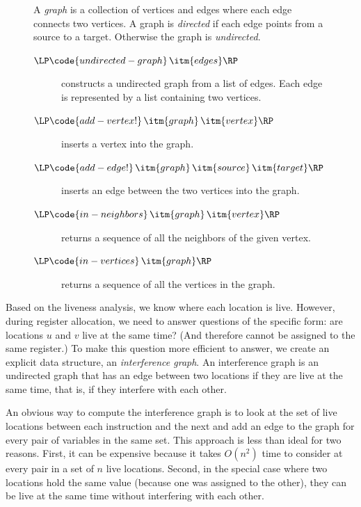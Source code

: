 \documentclass[11pt]{book}
\begin{document}
{\begin{figure}
  \small
  \begin{tcolorbox}[title=\href{https://docs.racket-lang.org/graph/index.html}{The Racket Graph Library}]
    A \emph{graph} is a collection of vertices and edges where each
    edge connects two vertices.  A graph is \emph{directed} if each
    edge points from a source to a target.  Otherwise the graph is
    \emph{undirected}.
  \begin{description}
  \item[$\LP\code{undirected-graph}\,\itm{edges}\RP$] constructs a
    undirected graph from a list of edges. Each edge is represented by
    a list containing two vertices.
  \item[$\LP\code{add-vertex!}\,\itm{graph}\,\itm{vertex}\RP$]
    inserts a vertex into the graph.
  \item[$\LP\code{add-edge!}\,\itm{graph}\,\itm{source}\,\itm{target}\RP$]
    inserts an edge between the two vertices into the graph.
  \item[$\LP\code{in-neighbors}\,\itm{graph}\,\itm{vertex}\RP$]
    returns a sequence of all the neighbors of the given vertex.
  \item[$\LP\code{in-vertices}\,\itm{graph}\RP$]
    returns a sequence of all the vertices in the graph.
  \end{description}
\end{tcolorbox}
\end{figure}

Based on the liveness analysis, we know where each location is live.
However, during register allocation, we need to answer questions of
the specific form: are locations $u$ and $v$ live at the same time?
(And therefore cannot be assigned to the same register.)  To make this
question more efficient to answer, we create an explicit data
structure, an \emph{interference graph}.  An
interference graph is an undirected graph that has an edge between two
locations if they are live at the same time, that is, if they
interfere with each other.

An obvious way to compute the interference graph is to look at the set
of live locations between each instruction and the next and add an edge to the graph
for every pair of variables in the same set.  This approach is less
than ideal for two reasons. First, it can be expensive because it
takes $O(n^2)$ time to consider at every pair in a set of $n$ live
locations. Second, in the special case where two locations hold the
same value (because one was assigned to the other), they can be live
at the same time without interfering with each other.

}
\end{document}
